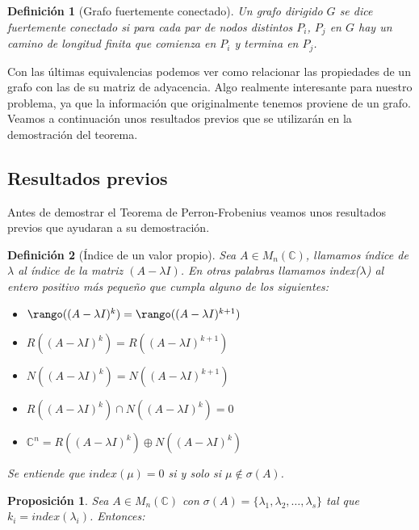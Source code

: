 \documentclass[size=a4, parskip=half, titlepage=false, toc=flat, toc=bib, 12pt]{scrartcl}
\theoremstyle{theorem-style}
\newtheorem{nprop}{Proposición}[section]
\theoremstyle{definition-style}
\newtheorem{ndef}{Definición}[section]
\theoremstyle{remark-style}
\theoremstyle{example-style}
\theoremstyle{definition-style}
\theoremstyle{remark-style}
\begin{document}
\begin{ndef}[Grafo fuertemente conectado]
Un grafo dirigido $G$ se dice fuertemente conectado si para cada par de nodos distintos $P_i$, $P_j$ en $G$ hay un camino de longitud finita que comienza en $P_i$ y termina en $P_j$.
\end{ndef}

Con las últimas equivalencias podemos ver como relacionar las propiedades de un grafo con las de su matriz de adyacencia. Algo realmente interesante para nuestro problema, ya que la información que originalmente tenemos proviene de un grafo. Veamos a continuación unos resultados previos que se utilizarán en la demostración del teorema.

\newpage

\subsection{Resultados previos}

Antes de demostrar el Teorema de Perron-Frobenius veamos unos resultados previos que ayudaran a su demostración.

\begin{ndef}[Índice de un valor propio]
\label{index}
Sea $A \in M_n(\mathbb{C})$, llamamos índice de $\lambda$ al índice de la matriz $(A-\lambda I)$. En otras palabras llamamos index($\lambda$) al entero positivo más pequeño que cumpla alguno de los siguientes:
\begin{itemize}
\item $\rango ((A - \lambda I)^k) = \rango ((A - \lambda I)^{k+1})$
\item $R((A - \lambda I)^k) = R ((A - \lambda I)^{k+1})$
\item $N((A - \lambda I)^k) = N ((A - \lambda I)^{k+1})$
\item $R((A - \lambda I)^k) \cap N((A -\lambda I)^k) =0$
\item $ \mathbb{C}^n = R((A - \lambda I)^k) \oplus N((A- \lambda I)^k)$
\end{itemize}
Se entiende que $index(\mu) = 0$ si y solo si $\mu \notin \sigma(A)$.
\end{ndef}

\begin{nprop}
\label{funcionjordan}
Sea $A \in M_n(\mathbb{C})$ con $\sigma(A) = \{ \lambda_1, \lambda_2, \dots , \lambda_s\}$ tal que $k_i = index(\lambda_i)$. Entonces:
\end{nprop}
\end{document}

